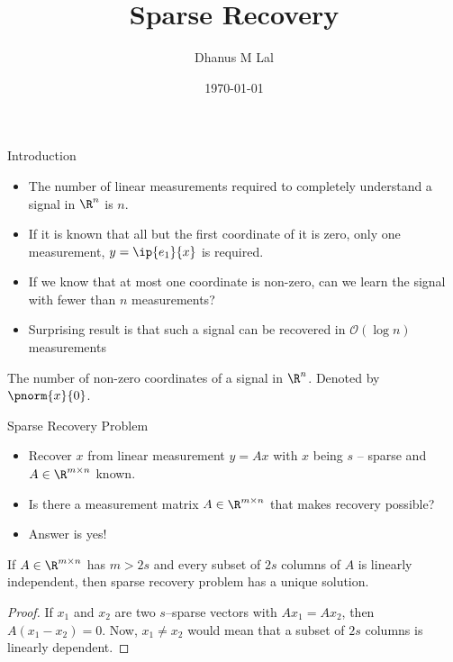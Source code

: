 \documentclass{beamer}
\title{Sparse Recovery}
\author{Dhanus M Lal}
\date{\today}
\begin{document}
\begin{frame}
	\titlepage
\end{frame}

\begin{frame}{Introduction}
	\begin{itemize}
		\item 
			The number of linear measurements required to completely
			understand a signal in $\R^n$ is $n$.
		
		\pause

		\item 
			If it is known that all but the first coordinate
			of it is zero, only one measurement, $y = \ip{e_1}{x}$ is 
			required.
	\pause	
		\item 
			If we know that at most one coordinate is non-zero,
			can we learn the signal with fewer than $n$ measurements?
		
		\pause

		\item Surprising result is that such a signal can be
			recovered in $\mathcal{O}(\log n)$ measurements
	\end{itemize}

\pause 

	\begin{definition}[Sparsity]
		The number of non-zero coordinates of a signal in $\R^n$.
		Denoted by $\pnorm{x}{0}$.
	\end{definition}
\end{frame}


\begin{frame}{Sparse Recovery Problem}
	\begin{itemize}
		\item Recover $x$ from linear measurement $y = Ax$ with
			$x$ being $s$ -- sparse and $A\in \R^{m\times n}$ known.

			\pause

		\item Is there a measurement matrix $A\in\R^{m\times n}$
			that makes recovery possible?

			\pause

		\item Answer is yes!
	\end{itemize}

	\pause

	\begin{proposition}
		If $A\in \R^{m\times n}$ has $m>2s$ and every subset of $2s$
		columns of $A$ is linearly independent, then sparse recovery
		problem has a unique solution.
	\end{proposition}
\pause 

	\begin{proof}
		If $x_1$ and $x_2$ are two $s$--sparse vectors with
		$Ax_1 = Ax_2$, then $A(x_1-x_2) = 0$. Now, $x_1\neq x_2$ would
		mean that a subset of $2s$ columns is linearly dependent.
	\end{proof}
\end{frame}
\end{document}
